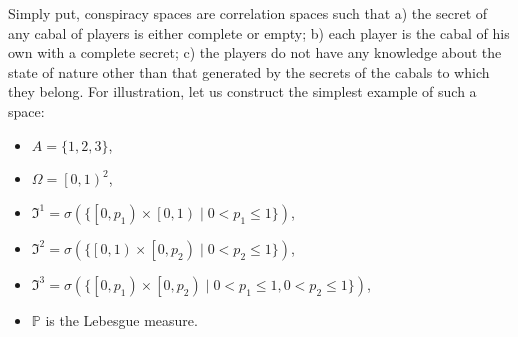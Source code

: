 Simply put, conspiracy spaces are correlation spaces such that a) the secret of any cabal of players is either complete or empty; b) each player is the cabal of his own with a complete secret; c) the players do not have any knowledge about the state of nature other than that generated by the secrets of the cabals to which they belong. For illustration, let us construct the simplest example of such a space: %
\begin{itemize}
	\item $A = \{1, 2, 3\}$,
	\item $\Omega = \left[0, 1\right)^2$,
	\item $\mathfrak{I}^1 = \sigma(\{\left[ 0, p_1 \right) \times \left[ 0, 1 \right) \mid 0 < p_1 \leq 1 \})$,
	\item $\mathfrak{I}^2 = \sigma(\{\left[ 0, 1 \right) \times \left[ 0, p_2 \right) \mid 0 < p_2 \leq 1 \})$,
	\item $\mathfrak{I}^3 = \sigma(\{\left[ 0, p_1 \right) \times \left[ 0, p_2 \right) \mid 0 < p_1 \leq 1, 0 < p_2 \leq 1 \})$,
	\item $\mathbb{P}$ is the Lebesgue measure. %
\end{itemize}

